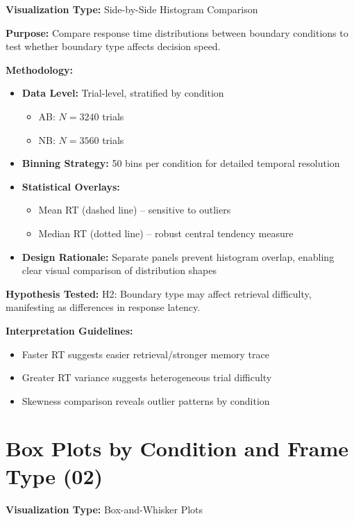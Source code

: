 \documentclass[12pt,a4paper]{article}
\begin{document}
\textbf{Visualization Type:} Side-by-Side Histogram Comparison

\textbf{Purpose:} Compare response time distributions between boundary conditions to test whether boundary type affects decision speed.

\textbf{Methodology:}
\begin{itemize}
    \item \textbf{Data Level:} Trial-level, stratified by condition
        \begin{itemize}
            \item AB: $N=3240$ trials
            \item NB: $N=3560$ trials
        \end{itemize}
    \item \textbf{Binning Strategy:} 50 bins per condition for detailed temporal resolution
    \item \textbf{Statistical Overlays:}
        \begin{itemize}
            \item Mean RT (dashed line) -- sensitive to outliers
            \item Median RT (dotted line) -- robust central tendency measure
        \end{itemize}
    \item \textbf{Design Rationale:} Separate panels prevent histogram overlap, enabling clear visual comparison of distribution shapes
\end{itemize}

\textbf{Hypothesis Tested:} H2: Boundary type may affect retrieval difficulty, manifesting as differences in response latency.

\textbf{Interpretation Guidelines:}
\begin{itemize}
    \item Faster RT suggests easier retrieval/stronger memory trace
    \item Greater RT variance suggests heterogeneous trial difficulty
    \item Skewness comparison reveals outlier patterns by condition
\end{itemize}

\newpage
\section{Box Plots by Condition and Frame Type (02)}

\textbf{Visualization Type:} Box-and-Whisker Plots
\end{document}
